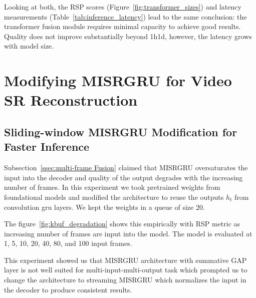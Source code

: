 Looking at both, the RSP scores (Figure~\ref{fig:transformer_sizes}) and latency               
measurements (Table~\ref{tab:inference_latency}) lead to the same conclusion: the             
transformer fusion module requires minimal capacity to achieve good results. 
Quality does not improve substantially beyond 1h1d, however, the latency 
grows with model size.



\section{Modifying MISRGRU for Video SR Reconstruction}

\subsection{Sliding-window MISRGRU Modification for Faster Inference}
\label{ssec:kbuf_misrgru}

Subsection~\ref{ssec:multi-frame Fusion} claimed that MISRGRU oversaturates the input into the 
decoder and quality of the output degrades with the increasing number of frames. 
In this experiment we took pretrained weights from foundational models and modified the architecture
to reuse the outputs $h_t$ from convolution gru layers. We kept the weights in a queue of size 20.

The figure~\ref{fig:kbuf_degradation} shows this empirically with RSP metric as increasing number
of frames are input into the model. The model is evaluated at 1, 5, 10, 20, 40, 80, and 100 
input frames.

This experiment showed us that MISRGRU architecture with summative GAP layer is not well 
suited for multi-input-multi-output task which prompted us to change the architecture to streaming MISRGRU
which normalizes the input in the decoder to produce consistent results.

